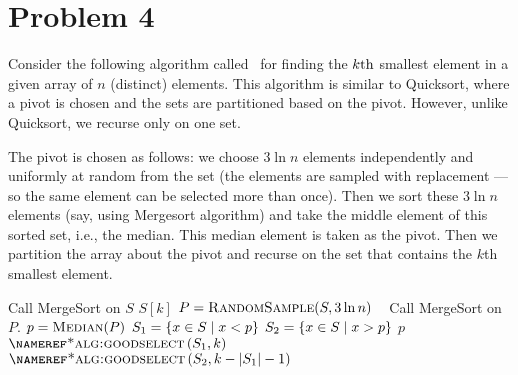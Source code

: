 \documentclass[11pt]{article}
\begin{document}
\section*{Problem 4}


    Consider the following algorithm called~ for finding the $k\text{th}$ smallest element
    in a given array of $n$ (distinct) elements.
    This algorithm is similar to Quicksort, where a pivot is chosen and the sets are partitioned based on the pivot. However, unlike Quicksort, we recurse only on one set.

 The pivot is chosen as follows: we choose $3\ln n$ elements independently and uniformly at random from the set (the elements are sampled with replacement --- so the same element can be selected more than once). Then we sort
    these $3\ln n$ elements (say, using Mergesort algorithm) and take the middle  element of this sorted set, i.e., the median. This median element is taken as the pivot. Then we partition the array about the pivot and recurse on the set that contains the $k$th smallest element.

    \begin{algorithm}[H]
        \caption[]{
            }\label{alg:goodselect}
        \begin{algorithmic}[1]
            \State Call MergeSort on $S$
            \State \Return $S[k]$
            \Else
            \State $P\gets \textproc{RandomSample}(S, 3\ln n)$ \
            \State Call MergeSort on $P$.
            \State $p\gets \textproc{Median}(P)$ 
            \State $S_1 = \left\lbrace x\in S \mid x < p\right\rbrace$
            \State $S_2 = \left\lbrace x\in S \mid x > p\right\rbrace$
            \State \Return $p$
            \State \Return $\Call{\nameref*{alg:goodselect}}{S_1, k}$
            \Else
            \State \Return $\Call{\nameref*{alg:goodselect}}{S_2, k - \card{S_1} - 1}$
            \EndIf
            \EndIf
            \EndFunction
        \end{algorithmic}
    \end{algorithm}
\end{document}
